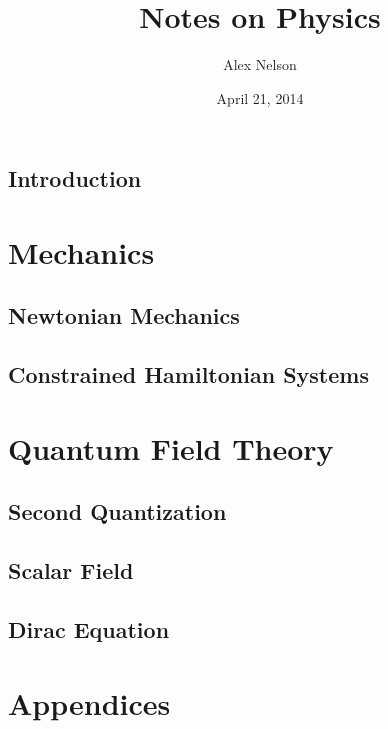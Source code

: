 \documentclass[oneside]{book}
\date{April 21, 2014}
\title{Notes on Physics}
\author{Alex Nelson}
\begin{document}
\frontmatter%

\maketitle

\preface %
\hypersetup{pageanchor=true}


\tableofcontents

\mainmatter%
\chapter{Introduction}


\part{Mechanics}
\chapter{Newtonian Mechanics}



\chapter{Constrained Hamiltonian Systems}


\part{Quantum Field Theory}
\chapter{Second Quantization}

\chapter{Scalar Field}

\chapter{Dirac Equation}


\backmatter%
\part{Appendices}
\appendix
\printbibliography[heading=bibintoc]
\clearpage
{}
\printindex
\end{document}
